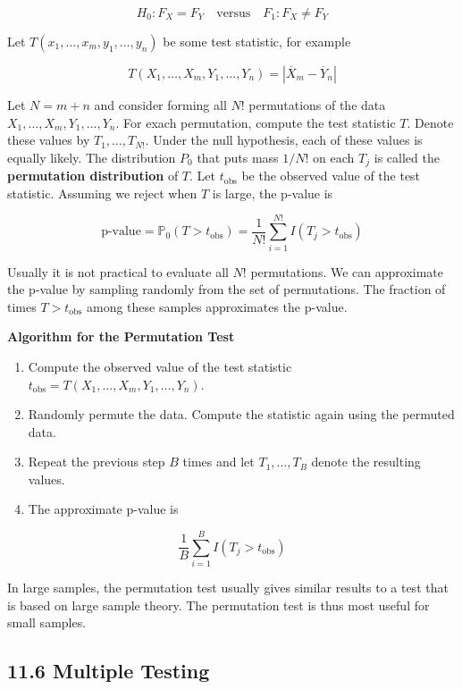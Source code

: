 \[ H_0: F_X = F_Y \quad \text{versus} \quad F_1: F_X \neq F_Y\]

Let \(T(x_1, \dots, x_m, y_1, \dots, y_n)\) be some test statistic, for
example

\[ T(X_1, \dots, X_m, Y_1, \dots, Y_n) = | \overline{X}_m - \overline{Y}_n |\]

Let \(N = m + n\) and consider forming all \(N!\) permutations of the
data \(X_1, \dots, X_m, Y_1, \dots, Y_n\). For exach permutation,
compute the test statistic \(T\). Denote these values by
\(T_1, \dots, T_{N!}\). Under the null hypothesis, each of these values
is equally likely. The distribution \(P_0\) that puts mass \(1 / N!\) on
each \(T_j\) is called the \textbf{permutation distribution} of \(T\).
Let \(t_\text{obs}\) be the observed value of the test statistic.
Assuming we reject when \(T\) is large, the p-value is

\[ \text{p-value} = \mathbb{P}_0(T > t_\text{obs}) = \frac{1}{N!} \sum_{i=1}^{N!} I(T_j > t_\text{obs}) \]

Usually it is not practical to evaluate all \(N!\) permutations. We can
approximate the p-value by sampling randomly from the set of
permutations. The fraction of times \(T > t_\text{obs}\) among these
samples approximates the p-value.

\textbf{Algorithm for the Permutation Test}

\begin{enumerate}[label={\arabic*.}]
\item
  Compute the observed value of the test statistic
  \(t_\text{obs} = T(X_1, \dots, X_m, Y_1, \dots, Y_n)\).
\item
  Randomly permute the data. Compute the statistic again using the
  permuted data.
\item
  Repeat the previous step \(B\) times and let \(T_1, \dots, T_B\)
  denote the resulting values.
\item
  The approximate p-value is
\end{enumerate}

\[ \frac{1}{B} \sum_{i=1}^B I(T_j > t_\text{obs}) \]

In large samples, the permutation test usually gives similar results to
a test that is based on large sample theory. The permutation test is
thus most useful for small samples.

\subsection{11.6 Multiple Testing}\label{multiple-testing}

